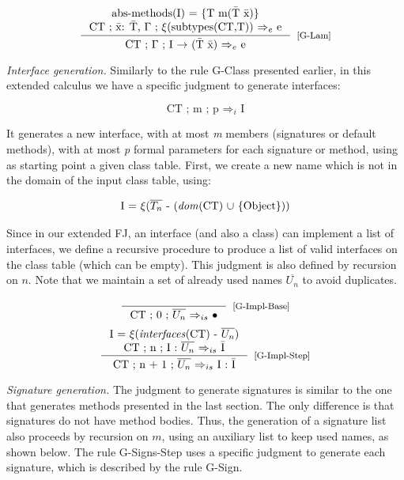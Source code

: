 \documentclass[tese,capa,english]{texufpel}
\begin{document}
\[
\inference{\textrm{abs-methods(I) = \{T m(\={T} \={x})\}} \\
           \textrm{CT ; \={x}: \={T}, $\Gamma$ ; $\xi$(subtypes(CT,T)) $\Rightarrow_{e}$ e}}
          {\textrm{CT ; $\Gamma$ ; I $->$ (\={T} \={x}) $\Rightarrow_{e}$ e}}[\footnotesize{[G-Lam]}]
\]

\vspace{8pt}

\noindent\emph{Interface generation.} Similarly to the rule {\footnotesize G-Class} presented earlier, in this extended calculus we have a specific judgment to generate interfaces:

\[
\textrm{CT ; m ; p $\Rightarrow_{i}$ I}
\]

It generates a new interface, with at most \emph{m} members (signatures or default methods), with at most \emph{p} formal parameters for each signature or method, using as starting point a given class table. First, we create a new name which is not in the domain of the input class table, using:

\[
\textrm{I = $\xi$($\overline{T_n}$ - (\emph{dom}(CT) $\cup$ \{Object\}))}
\]

Since in our extended FJ, an interface (and also a class) can implement a list of interfaces, we define a recursive procedure to produce a list of valid interfaces on the class table (which can be empty). This judgment is also defined by recursion on $n$. Note that we maintain a set of already used names $\overline{U_n}$ to avoid duplicates.

\[
\inference{}
          {\textrm{CT ; 0 ; $\overline{U_n}$ $\Rightarrow_{is}$ $\bullet$}}[\footnotesize{[G-Impl-Base]}] 
\]
\[
\inference{\textrm{I = $\xi$(\emph{interfaces}(CT) - $\overline{U_n}$)} \\
           \textrm{CT ; n ; I : $\overline{U_n}$ $\Rightarrow_{is}$ \={I}}}
          {\textrm{CT ; n + 1 ; $\overline{U_n}$ $\Rightarrow_{is}$ I : \={I}}}[\footnotesize{[G-Impl-Step]}]
\]

\vspace{8pt}

\noindent\emph{Signature generation.} The judgment to generate signatures is similar to the one that generates methods presented in the last section. The only difference is that signatures do not have method bodies. Thus, the generation of a signature list also proceeds by recursion on $m$, using an auxiliary list to keep used names, as shown below. The rule {\footnotesize G-Signs-Step} uses a specific judgment to generate each signature, which is described by the rule {\footnotesize G-Sign}.
\end{document}
